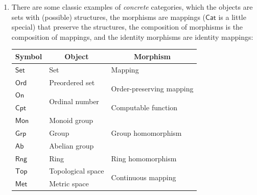 \documentclass{article}
\begin{document}
\begin{exm}
\begin{enumerate}
		\item There are some classic examples of \emph{concrete} categories, which the objects are sets with (possible) structures, the morphisms are mappings ($\mathsf{Cat}$ is a little special) that preserve the structures, the composition of morphisms is the composition of mappings, and the identity morphisms are identity mappings:
		\begin{table}[ht]\centering
		\begin{tabular}{|l|l|l|}
			\hline
			\multicolumn{1}{|c|}{\textbf{Symbol}} & \multicolumn{1}{c|}{\textbf{Object}}           & \multicolumn{1}{c|}{\textbf{Morphism}}      \\ \hline
			$\mathsf{Set}$                        & Set                                            & Mapping                                     \\ \hline
			$\mathsf{Ord}$                        & Preordered set                                 & \multirow{2}{*}{Order-preserving mapping}   \\ \cline{1-2}
			$\mathsf{On}$                         & \multirow{2}{*}{Ordinal number}                &                                             \\ \cline{1-1} \cline{3-3} 
			$\mathsf{Cpt}$                        &                                                & Computable function                         \\ \hline
			$\mathsf{Mon}$                        & Monoid group                                   & \multirow{3}{*}{Group homomorphism}         \\ \cline{1-2}
			$\mathsf{Grp}$                        & Group                                          &                                             \\ \cline{1-2}
			$\mathsf{Ab}$                         & Abelian group                                  &                                             \\ \hline
			$\mathsf{Rng}$                        & Ring                                           & Ring homomorphism                           \\ \hline
			$\mathsf{Top}$                        & Topological space                              & \multirow{2}{*}{Continuous mapping}         \\ \cline{1-2}
			$\mathsf{Met}$                        & Metric space                                   &                                             \\ \hline

\end{tabular}
\end{table}
\end{enumerate}
\end{exm}
\end{document}
